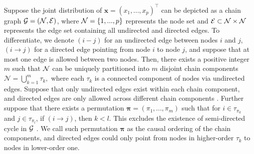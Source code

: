 \documentclass[12pt]{article}
\newcommand{\NNN}{\mathcal N}
\newcommand{\xx}{\mathbf x}
\newcommand{\1}{\uppercase\expandafter{\romannumeral1}}
\newcommand{\2}{\uppercase\expandafter{\romannumeral2}}
\newcommand{\0}{\textbf{0}}
\begin{document}
Suppose the joint distribution of $\xx=(x_1,...,x_p)^\top$ can be depicted as a chain graph ${\cal G}=({\cal N}, {\cal E})$, where ${\cal N}=\{1,...,p\}$ represents the node set and ${\cal E} \subset {\cal N} \times {\cal N}$ represents the edge set containing all undirected and directed edges. To differentiate, we denote $(i - j)$ for an undirected edge between nodes $i$ and $j$, $(i \rightarrow j)$ for a directed edge pointing from node $i$ to node $j$, and suppose that at most one edge is allowed between two nodes.
Then, there exists a positive integer $m$ such that ${\cal N}$ can be uniquely partitioned into $m$ disjoint chain components $\NNN = \bigcup_{k=1}^m \tau_k,$ where each $\tau_k$ is a connected component of nodes via undirected edges.
Suppose that only undirected edges exist within each chain component, and directed edges are only allowed across different chain components \cite{Maathuis2018, Drton2006}. Further suppose that there exists a permutation $\boldsymbol{\pi}=(\pi_1,...,\pi_m)$ such that for $i \in \tau_{\pi_k}$ and $j \in \tau_{\pi_l}$, if $(i\rightarrow j)$, then $k<l$. 
This excludes the existence of semi-directed cycle in $\cal G$ \cite{Maathuis2018}.
We call such permutation $\boldsymbol{\pi}$ as the causal ordering of the chain components, and directed edges could only point from nodes in higher-order $\tau_k$ to nodes in lower-order one.
\end{document}
